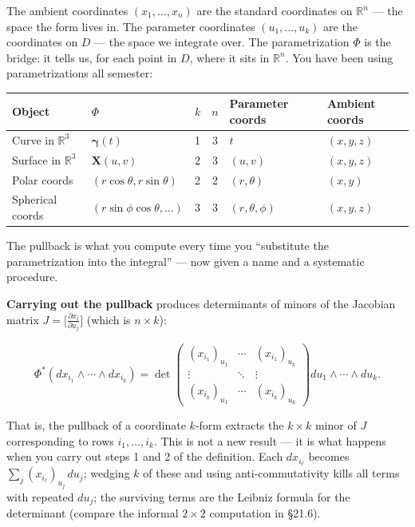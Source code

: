 \documentclass[11pt]{report}
\newcommand{\R}{\mathbb{R}}
\newcommand{\parti}[2]{\frac{\partial #1}{\partial #2}}
\begin{document}
\begin{remark}
The ambient coordinates $(x_1, \ldots, x_n)$ are the standard coordinates on $\R^n$ --- the space the form lives in. The parameter coordinates $(u_1, \ldots, u_k)$ are the coordinates on $D$ --- the space we integrate over. The parametrization $\Phi$ is the bridge: it tells us, for each point in $D$, where it sits in $\R^n$. You have been using parametrizations all semester:
\begin{center}
\renewcommand{\arraystretch}{1.4}
\begin{tabular}{|l|l|c|c|l|l|}
\hline
\textbf{Object} & \textbf{$\Phi$} & $k$ & $n$ & \textbf{Parameter coords} & \textbf{Ambient coords} \\
\hline
Curve in $\R^3$ & $\boldsymbol{\gamma}(t)$ & 1 & 3 & $t$ & $(x,y,z)$ \\
\hline
Surface in $\R^3$ & $\mathbf{X}(u,v)$ & 2 & 3 & $(u,v)$ & $(x,y,z)$ \\
\hline
Polar coords & $(r\cos\theta, r\sin\theta)$ & 2 & 2 & $(r,\theta)$ & $(x,y)$ \\
\hline
Spherical coords & $(r\sin\phi\cos\theta, \ldots)$ & 3 & 3 & $(r,\theta,\phi)$ & $(x,y,z)$ \\
\hline
\end{tabular}
\end{center}
The pullback is what you compute every time you ``substitute the parametrization into the integral'' --- now given a name and a systematic procedure.
\end{remark}

\textbf{Carrying out the pullback} produces determinants of minors of the Jacobian matrix $J = \big[\parti{x_i}{u_j}\big]$ (which is $n \times k$):

\[
\Phi^*(dx_{i_1} \wedge \cdots \wedge dx_{i_k}) = \det \begin{pmatrix} (x_{i_1})_{u_1} & \cdots & (x_{i_1})_{u_k} \\ \vdots & \ddots & \vdots \\ (x_{i_k})_{u_1} & \cdots & (x_{i_k})_{u_k} \end{pmatrix} du_1 \wedge \cdots \wedge du_k.
\]

That is, the pullback of a coordinate $k$-form extracts the $k \times k$ minor of $J$ corresponding to rows $i_1, \ldots, i_k$. This is not a new result --- it is what happens when you carry out steps 1 and 2 of the definition. Each $dx_{i_\ell}$ becomes $\sum_j (x_{i_\ell})_{u_j}\,du_j$; wedging $k$ of these and using anti-commutativity kills all terms with repeated $du_j$; the surviving terms are the Leibniz formula for the determinant (compare the informal $2 \times 2$ computation in \S21.6).
\end{document}
